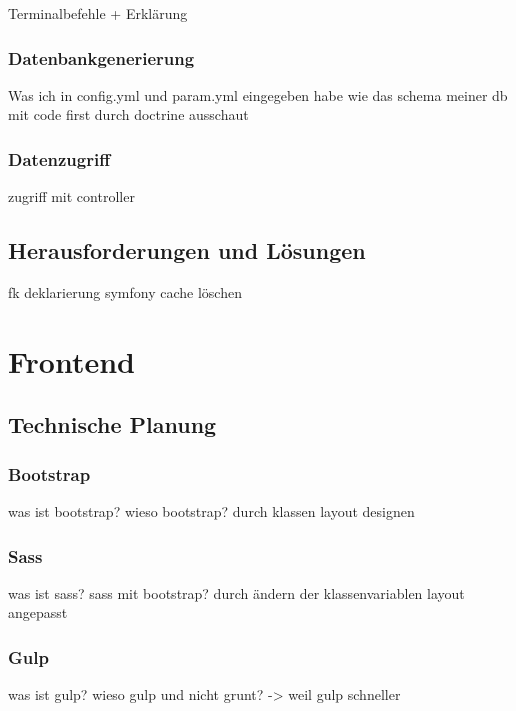 Terminalbefehle + Erklärung

    \subsubsection{Datenbankgenerierung}

Was ich in config.yml und param.yml eingegeben habe
wie das schema meiner db mit code  first durch doctrine ausschaut

    \subsubsection{Datenzugriff}

zugriff mit controller

  \subsection{Herausforderungen und Lösungen}

fk deklarierung
symfony cache löschen

\section{Frontend}

  \subsection{Technische Planung}

    \subsubsection{Bootstrap}

was ist bootstrap? wieso bootstrap? durch klassen layout designen

    \subsubsection{Sass}

was ist sass? sass mit bootstrap? 
durch ändern der klassenvariablen layout angepasst

    \subsubsection{Gulp}

was ist gulp? wieso gulp und nicht grunt? -> weil gulp schneller

